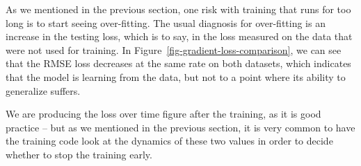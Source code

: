 \documentclass[
  letterpaper,
]{scrbook}
\begin{document}
As we mentioned in the previous section, one risk with training that
runs for too long is to start seeing over-fitting. The usual diagnosis
for over-fitting is an increase in the testing loss, which is to say, in
the loss measured on the data that were not used for training. In
Figure~\ref{fig-gradient-loss-comparison}, we can see that the RMSE loss
decreases at the same rate on both datasets, which indicates that the
model is learning from the data, but not to a point where its ability to
generalize suffers.


\begin{figure}[bt]



\end{figure}%

We are producing the loss over time figure after the training, as it is
good practice -- but as we mentioned in the previous section, it is very
common to have the training code look at the dynamics of these two
values in order to decide whether to stop the training early.
\end{document}
